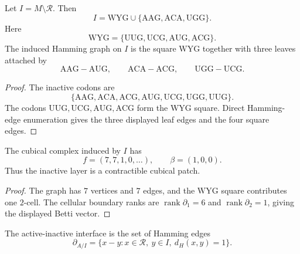 \begin{theorem}
\label{thm:philosophy-inactive-median-layer}
Let $I=M\setminus\mathcal{R}$. Then
$$
  I
  =
  \mathrm{WYG}\cup\{\mathrm{AAG},\mathrm{ACA},\mathrm{UGG}\}.
$$
Here
$$
  \mathrm{WYG}
  =
  \{\mathrm{UUG},\mathrm{UCG},\mathrm{AUG},\mathrm{ACG}\}.
$$
The induced Hamming graph on $I$ is the square $\mathrm{WYG}$ together
with three leaves attached by
$$
  \mathrm{AAG}-\mathrm{AUG},\qquad
  \mathrm{ACA}-\mathrm{ACG},\qquad
  \mathrm{UGG}-\mathrm{UCG}.
$$
\end{theorem}
\begin{proof}
The inactive codons are
$$
  \{\mathrm{AAG},\mathrm{ACA},\mathrm{ACG},
    \mathrm{AUG},\mathrm{UCG},\mathrm{UGG},\mathrm{UUG}\}.
$$
The codons $\mathrm{UUG},\mathrm{UCG},\mathrm{AUG},\mathrm{ACG}$ form
the $\mathrm{WYG}$ square. Direct Hamming-edge enumeration gives the
three displayed leaf edges and the four square edges.
\end{proof}

\begin{corollary}
\label{cor:philosophy-inactive-layer-contractible}
The cubical complex induced by $I$ has
$$
  f=(7,7,1,0,\ldots),
  \qquad
  \beta=(1,0,0).
$$
Thus the inactive layer is a contractible cubical patch.
\end{corollary}
\begin{proof}
The graph has $7$ vertices and $7$ edges, and the $\mathrm{WYG}$ square
contributes one $2$-cell. The cellular boundary ranks are
$\operatorname{rank}\partial_{1}=6$ and
$\operatorname{rank}\partial_{2}=1$, giving the displayed Betti vector.
\end{proof}

\begin{definition}
\label{def:philosophy-active-inactive-interface}
The active-inactive interface is the set of Hamming edges
$$
  \partial_{A/I}
  =
  \{x-y:x\in\mathcal{R},\ y\in I,\ d_H(x,y)=1\}.
$$
\end{definition}

